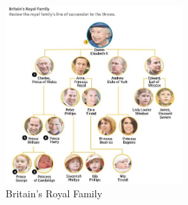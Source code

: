 \documentclass[11pt,addpoints,answers]{exam}
\newcommand{\sall}{\textbf{Select all that apply: }}
\begin{document}
\begin{questions}
\begin{parts}
    
    

    \begin{figure}[H]
        \centering
        \includegraphics[width=0.6\textwidth]{fig/BritiansRoyalFamily.jpg}
        \caption{Britain's Royal Family}
        \label{fig:family}
    \end{figure}
    

\end{parts}
\end{questions}
\end{document}
